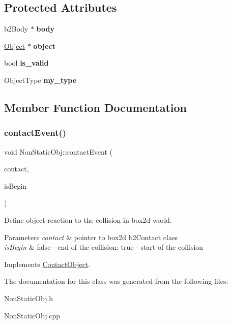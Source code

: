 \subsection*{Protected Attributes}
\begin{DoxyCompactItemize}
\item 
\mbox{\label{class_non_static_obj_a42cf308f091557d0d8a8e6ae8ee0fcf1}} 
b2\+Body $\ast$ {\bfseries body}
\item 
\mbox{\label{class_non_static_obj_a61a8004d502132c7a13258e945300a5e}} 
\hyperlink{class_object}{Object} $\ast$ {\bfseries object}
\item 
\mbox{\label{class_non_static_obj_a41c92f702f36f05877e74fef1fcb3a71}} 
bool {\bfseries is\+\_\+valid}
\item 
\mbox{\label{class_non_static_obj_a4328e86d88a94270b88acb0d3965112b}} 
Object\+Type {\bfseries my\+\_\+type}
\end{DoxyCompactItemize}


\subsection{Member Function Documentation}
\mbox{\label{class_non_static_obj_ae129119384cf9df2b7b1a7849b6112de}} 
\subsubsection{\texorpdfstring{contact\+Event()}{contactEvent()}}
{\footnotesize\ttfamily void Non\+Static\+Obj\+::contact\+Event (\begin{DoxyParamCaption}\item[{b2\+Contact $\ast$}]{contact,  }\item[{bool}]{is\+Begin }\end{DoxyParamCaption})\hspace{0.3cm}{\ttfamily [virtual]}}



Define object reaction to the collision in box2d world. 


\begin{DoxyParams}{Parameters}
{\em contact} & pointer to box2d b2\+Contact class \\
\hline
{\em is\+Begin} & \textquotesingle{}false\textquotesingle{} -\/ end of the collision; \textquotesingle{}true\textquotesingle{} -\/ start of the collision \\
\hline
\end{DoxyParams}


Implements \hyperlink{class_contact_object_a53d2dfc1d9c2821e9c62e80ce62a6435}{Contact\+Object}.



The documentation for this class was generated from the following files\+:\begin{DoxyCompactItemize}
\item 
Non\+Static\+Obj.\+h\item 
Non\+Static\+Obj.\+cpp\end{DoxyCompactItemize}
